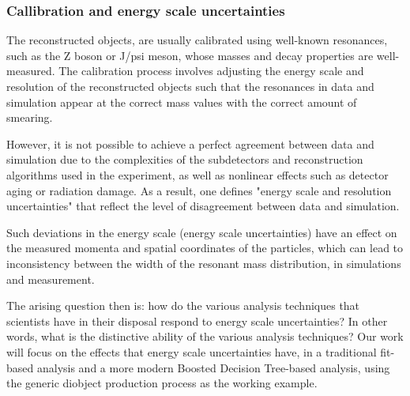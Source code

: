 \subsubsection{Callibration and energy scale uncertainties}
\label{sec:org41e8e4d}
The reconstructed objects, are usually calibrated using well-known resonances, such as the Z boson or J/psi meson, whose masses and decay properties are well-measured. The calibration process involves adjusting the energy scale and resolution of the reconstructed objects such that the resonances in data and simulation appear at the correct mass values with the correct amount of smearing.

However, it is not possible to achieve a perfect agreement between data and simulation due to the complexities of the subdetectors and reconstruction algorithms used in the experiment, as well as nonlinear effects such as detector aging or radiation damage. As a result, one defines "energy scale and resolution uncertainties" that reflect the level of disagreement between data and simulation.

Such deviations in the energy scale (energy scale uncertainties) have an effect on the measured momenta and spatial coordinates of the particles, which can lead to inconsistency between the width of the resonant mass distribution, in simulations and measurement.

The arising question then is: how do the various analysis techniques that scientists have in their disposal respond to energy scale uncertainties? In other words, what is the distinctive ability of the various analysis techniques? Our work will focus on the effects that energy scale uncertainties have, in a traditional fit-based analysis and a more modern Boosted Decision Tree-based analysis, using the generic diobject production process as the working example.
